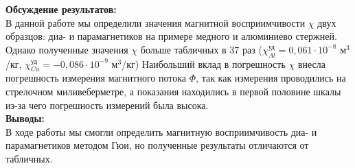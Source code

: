 \documentclass[a4paper, 12pt]{article}%
\begin{document}
	\newpage
	
	\textbf{Обсуждение результатов: }\\
	
	В данной работе мы определили значения магнитной восприимчивости $\chi$ двух образцов: диа- и парамагнетиков на примере медного и алюминиево стержней.
	Однако полученные значения $\chi$ больше табличных в 37 раз ($\chi_{Al}^{\text{уд}} = 0,061 \cdot 10^{-8}$ м$^3$/кг,   $\chi_{Cu}^{\text{уд}} = -0,086 \cdot 10^{-9}$ м$^3$/кг)
	Наибольший вклад в погрешность $\chi$ внесла погрешность измерения магнитного потока $\Phi$, так как измерения проводились на стрелочном миливеберметре, а показания находились в первой половине шкалы из-за чего погрешность измерений была высока.\\
	
	\textbf{Выводы: }\\
	
	В ходе работы мы смогли определить магнитную восприимчивость диа- и парамагнетиков методом Гюи, но полученные результаты отличаются от табличных. 
\end{document}
